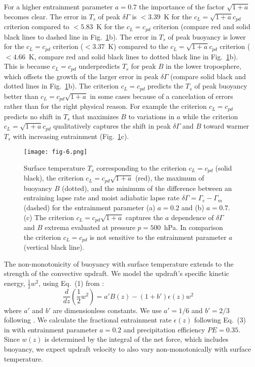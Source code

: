 \documentclass[]{ametsocV6.1}
\begin{document}
For a higher entrainment parameter $a=0.7$ the importance of the factor $\sqrt{1+a}$ becomes clear. The error in $T_s$ of peak $\delta \Gamma$ is $<3.39$~K for the $c_L=\sqrt{1+a}c_{pd}$ criterion compared to $<5.83$~K for the $c_L=c_{pd}$ criterion (compare red and solid black lines to dashed line in Fig.~\ref{fig:fig-6}b). The error in $T_s$ of peak buoyancy is lower for the $c_L=c_{pd}$ criterion ($<3.37$~K) compared to the $c_L=\sqrt{1+a}c_{pd}$ criterion ($<4.66$~K, compare red and solid black lines to dotted black line in Fig.~\ref{fig:fig-6}b). This is because $c_L=c_{pd}$ underpredicts $T_s$ for peak $B$ in the lower troposphere, which offsets the growth of the larger error in peak $\delta \Gamma$ (compare solid black and dotted lines in Fig.~\ref{fig:fig-6}b). The criterion $c_L=c_{pd}$ predicts the $T_s$ of peak buoyancy better than $c_L=c_{pd}\sqrt{1+a}$ in some cases because of a cancelation of errors rather than for the right physical reason. For example the criterion $c_L=c_{pd}$ predicts no shift in $T_s$ that maximizes $B$ to variations in $a$ while the criterion $c_L=\sqrt{1+a}c_{pd}$ qualitatively captures the shift in peak $\delta \Gamma$ and $B$ toward warmer $T_s$ with increasing entrainment (Fig.~\ref{fig:fig-6}c).

\begin{figure}[htbp]
 \centering
 \texttt{[image: fig-6.png]}\\
 \caption{Surface temperature $T_s$ corresponding to the criterion $c_L=c_{pd}$ (solid black), the criterion $c_L=c_{pd}\sqrt{1+a}$ (red), the maximum of buoyancy $B$ (dotted), and the minimum of the difference between an entraining lapse rate and moist adiabatic lapse rate $\delta \Gamma = \Gamma_e - \Gamma_m$ (dashed) for the entrainment parameter (a) $a=0.2$ and (b) $a=0.7$. (c) The criterion $c_L=c_{pd}\sqrt{1+a}$ captures the $a$ dependence of $\delta \Gamma$ and $B$ extrema evaluated at pressure $p=500$~hPa. In comparison the criterion $c_L=c_{pd}$ is not sensitive to the entrainment parameter $a$ (vertical black line).}\label{fig:fig-6}
\end{figure}

The non-monotonicity of buoyancy with surface temperature extends to the strength of the convective updraft. We model the updraft's specific kinetic energy, $\frac{1}{2}w^2$, using Eq.~(1) from \cite{delgenio2007}:
\begin{equation}
\frac{d}{dz}\left(\frac{1}{2}w^2\right)=a'B(z)-(1+b')\epsilon(z)w^2 \label{eq:momentum}
\end{equation}
where $a'$ and $b'$ are dimensionless constants. We use $a'=1/6$ and $b'=2/3$ following \cite{delgenio2007}. We calculate the fractional entrainment rate $\epsilon(z)$ following Eq.~(3) in \cite{romps2016} with entrainment parameter $a=0.2$ and precipitation efficiency $PE=0.35$. Since $w(z)$ is determined by the integral of the net force, which includes buoyancy, we expect updraft velocity to also vary non-monotonically with surface temperature.
\end{document}
